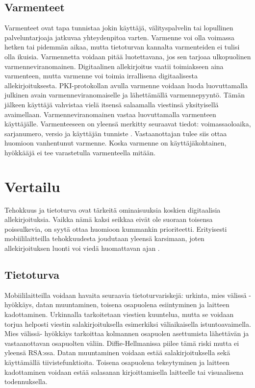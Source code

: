 \documentclass[finnish]{tktltiki2}
\theoremstyle{definition}
\theoremstyle{remark}
\begin{document}
\subsection{Varmenteet}

Varmenteet ovat tapa tunnistaa jokin käyttäjä, välityspalvelin tai lopullinen palveluntarjoaja jatkuvaa yhteydenpitoa varten. Varmenne voi olla voimassa hetken tai pidemmän aikaa, mutta tietoturvan kannalta varmenteiden ei tulisi olla ikuisia. Varmennetta voidaan pitää luotettavana, jos sen tarjoaa ulkopuolinen varmenneviranomainen. Digitaalinen allekirjoitus vaatii toimiakseen aina varmenteen, mutta varmenne voi toimia irrallisena digitaalisesta allekirjoituksesta. PKI-protokollan avulla varmenne voidaan luoda luovuttamalla julkinen avain varmenneviranomaiselle ja lähettämällä varmennepyyntö. Tämän jälkeen käyttäjä vahvistaa vielä itsensä salaamalla viestinsä yksityisellä avaimellaan. Varmenneviranomainen vastaa luovuttamalla varmenteen käyttäjälle. Varmenteeseen on yleensä merkitty seuraavat tiedot: voimassaoloaika, sarjanumero, versio ja käyttäjän tunniste \cite{ECC}. Vastaanottajan tulee siis ottaa huomioon vanhentunut varmenne. Koska varmenne on käyttäjäkohtainen, hyökkääjä ei tee varastetulla varmenteella mitään. 

\section{Vertailu}

Tehokkuus ja tietoturva ovat tärkeitä ominaisuuksia koskien digitaalisia allekirjoituksia. Vaikka nämä kaksi seikkaa eivät ole suoraan toisensa poissulkevia, on syytä ottaa huomioon kummankin prioriteetti. Erityisesti mobiililaitteilla tehokkuudesta joudutaan yleensä karsimaan, joten allekirjoituksen luonti voi viedä huomattavan ajan \cite{proxy}. 

\subsection{Tietoturva}

Mobiililaitteilla voidaan havaita seuraavia tietoturvariskejä: urkinta, mies välissä -hyökkäys, datan muuntaminen, toisena osapuolena esiintyminen ja laitteen kadottaminen. Urkinnalla tarkoitetaan viestien kuuntelua, mutta se voidaan torjua helposti viestin salakirjoituksella esimerkiksi väliaikaisella istuntoavaimella. Mies välissä- hyökkäys tarkoittaa kolmannen osapuolen asettumista lähettävän ja vastaanottavan osapuolten väliin. Diffie-Hellmanissa piilee tämä riski mutta ei yleensä RSA:ssa. Datan muuntaminen voidaan estää salakirjoituksella sekä käyttämällä tiivistefunktioita. Toisena osapuolena tekeytyminen ja laitteen kadottaminen voidaan estää salasanan kirjoittamisella laitteelle tai visuaalisena todennuksella. 
\end{document}
